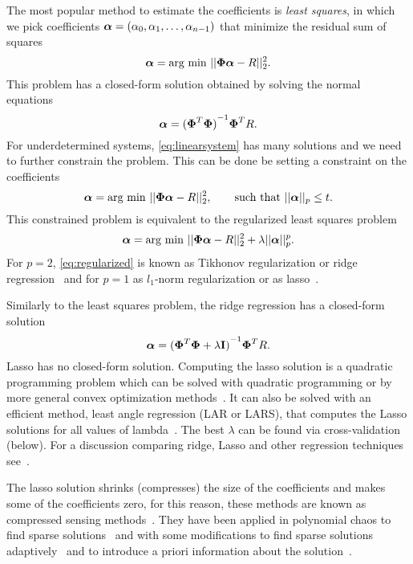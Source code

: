 The most popular method to estimate the coefficients is \textit{least squares}, in which we pick coefficients $\boldsymbol{\alpha}=(\alpha_0, \alpha_1, \dots, \alpha_{n-1})$ that minimize the residual sum of squares
\begin{equation}
  \boldsymbol{\alpha} = \text{arg min } ||\boldsymbol{\Phi}\boldsymbol{\alpha} - R||_2^2.
\end{equation}
This problem has a closed-form solution obtained by solving the normal equations~\cite{Trefethench111997}
\begin{equation}
  \boldsymbol{\alpha} = {(\boldsymbol{\Phi}^T \boldsymbol{\Phi})}^{-1} \boldsymbol{\Phi}^T R.
\end{equation}
For underdetermined systems, \cref{eq:linearsystem} has many solutions and we need to further constrain the problem. This can be done be setting a constraint on the coefficients
\begin{equation}
  \boldsymbol{\alpha} = \text{arg min } ||\boldsymbol{\Phi}\boldsymbol{\alpha} - R||_2^2, \qquad \text{such that } ||\boldsymbol{\alpha}||_p \leq t.
\end{equation}
This constrained problem is equivalent to the regularized least squares problem~\cite{Boydch62009}
\begin{equation}
  \boldsymbol{\alpha} = \text{arg min } ||\boldsymbol{\Phi}\boldsymbol{\alpha} - R||_2^2 + \lambda ||\boldsymbol{\alpha}||_p^p.
  \label{eq:regularized}
\end{equation}
For $p=2$, \cref{eq:regularized} is known as Tikhonov regularization or ridge regression~\cite{Hoerl1970} and for $p=1$ as $l_1$-norm regularization or as lasso~\cite{Tibshirani1994}.

Similarly to the least squares problem, the ridge regression has a closed-form solution
\begin{equation}
  \boldsymbol{\alpha} = {(\boldsymbol{\Phi}^T \boldsymbol{\Phi} + \lambda\mathbf{I})}^{-1} \boldsymbol{\Phi}^T R.
\end{equation}
Lasso has no closed-form solution. Computing the lasso solution is a quadratic programming problem which can be solved with quadratic programming or by more general convex optimization methods~\cite{Boyd2009}. It can also be solved with an efficient method, least angle regression (LAR or LARS), that computes the Lasso solutions for all values of lambda~\cite{Efron2004}. The best $\lambda$ can be found via cross-validation (below). For a discussion comparing ridge, Lasso and other regression techniques see~\cite{Hastie2009}.

The lasso solution shrinks (compresses) the size of the coefficients and makes some of the coefficients zero, for this reason, these methods are known as compressed sensing methods~\cite{Mathelin2012,Doostan2011}. They have been applied in polynomial chaos to find sparse solutions~\cite{Doostan2011} and with some modifications to find sparse solutions adaptively~\cite{Blatman2011,Jakeman2015} and to introduce a priori information about the solution~\cite{Peng2014}.

